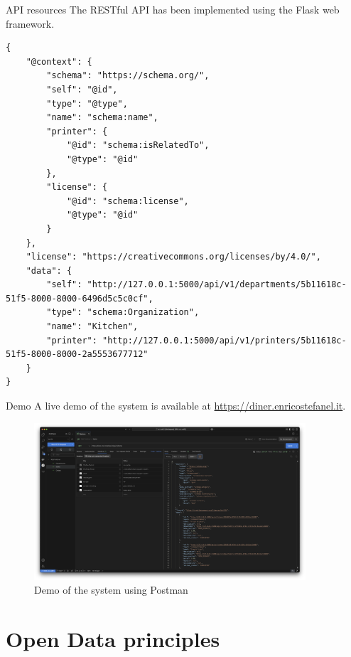 \begin{frame}{API resources}
	The RESTful API has been implemented using the Flask web framework.

	

	\framebreak

	\vspace*{-1\baselineskip}
	\begin{lstlisting}
{
	"@context": {
		"schema": "https://schema.org/",
		"self": "@id",
		"type": "@type",
		"name": "schema:name",
		"printer": {
			"@id": "schema:isRelatedTo",
			"@type": "@id"
		},
		"license": {
			"@id": "schema:license",
			"@type": "@id"
		}
	},
	"license": "https://creativecommons.org/licenses/by/4.0/",
	"data": {
		"self": "http://127.0.0.1:5000/api/v1/departments/5b11618c-51f5-8000-8000-6496d5c5c0cf",
		"type": "schema:Organization",
		"name": "Kitchen",
		"printer": "http://127.0.0.1:5000/api/v1/printers/5b11618c-51f5-8000-8000-2a5553677712"
	}
}\end{lstlisting}

\end{frame}

\begin{frame}{Demo}
	A live demo of the system is available at \url{https://diner.enricostefanel.it}.

	\begin{figure}
		\centering
		\includegraphics[width=0.9\textwidth,height=0.6\textheight,keepaspectratio]{images/postman.png}
		\vspace*{-1\baselineskip}
		\caption{Demo of the system using Postman}
		\label{fig:demo}
	\end{figure}
\end{frame}


\section{Open Data principles}

